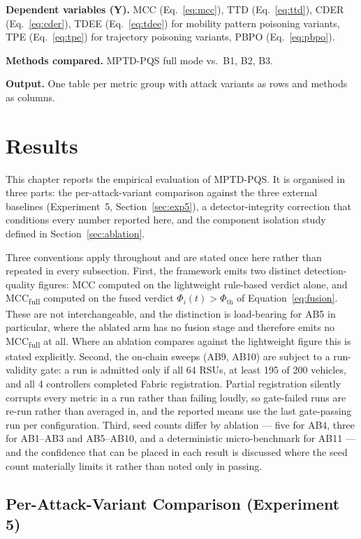 \documentclass[12pt, a4paper]{report}
\begin{document}
\textbf{Dependent variables (Y).}
MCC (Eq.~\ref{eq:mcc}),
TTD (Eq.~\ref{eq:ttd}),
CDER (Eq.~\ref{eq:cder}),
TDEE (Eq.~\ref{eq:tdee}) for mobility pattern poisoning variants,
TPE (Eq.~\ref{eq:tpe}) for trajectory poisoning variants,
PBPO (Eq.~\ref{eq:pbpo}).

\textbf{Methods compared.}
MPTD-PQS full mode vs.\ B1, B2, B3.

\textbf{Output.}
One table per metric group with attack variants as rows and
methods as columns.


\chapter{Results}
\label{chap:results}

This chapter reports the empirical evaluation of MPTD-PQS. It is
organised in three parts: the per-attack-variant comparison against the
three external baselines (Experiment~5, Section~\ref{sec:exp5}), a
detector-integrity correction that conditions every number reported
here, and the component isolation study defined in
Section~\ref{sec:ablation}.

Three conventions apply throughout and are stated once here rather than
repeated in every subsection. First, the framework emits two distinct
detection-quality figures: MCC computed on the lightweight rule-based
verdict alone, and MCC\textsubscript{full} computed on the fused verdict
$\Phi_i(t) > \Phi_{\mathrm{th}}$ of Equation~\ref{eq:fusion}. These are
not interchangeable, and the distinction is load-bearing for AB5 in
particular, where the ablated arm has no fusion stage and therefore
emits no MCC\textsubscript{full} at all. Where an ablation compares
against the lightweight figure this is stated explicitly. Second, the
on-chain sweeps (AB9, AB10) are subject to a run-validity gate: a run is
admitted only if all 64 RSUs, at least 195 of 200 vehicles, and all 4
controllers completed Fabric registration. Partial registration silently
corrupts every metric in a run rather than failing loudly, so gate-failed
runs are re-run rather than averaged in, and the reported means use the
last gate-passing run per configuration. Third, seed counts differ by
ablation --- five for AB4, three for AB1--AB3 and AB5--AB10, and a
deterministic micro-benchmark for AB11 --- and the confidence that can be
placed in each result is discussed where the seed count materially limits
it rather than noted only in passing.

\section{Per-Attack-Variant Comparison (Experiment 5)}
\label{sec:res-exp5}
\end{document}
